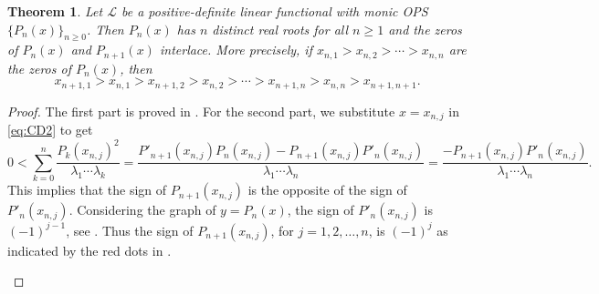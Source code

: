 \documentclass[oneside]{book}
\numberwithin{equation}{section}
\newtheorem{thm}{Theorem}[section]
\theoremstyle{definition}
\newcommand\LL{\mathcal{L}}
\begin{document}
\begin{thm}\label{thm:zero-interlace}
  Let \( \LL \) be a positive-definite linear functional with monic
  OPS \( \{ P_n(x) \}_{n\ge 0} \). Then \( P_n(x) \) has \( n \)
  distinct real roots for all \( n\ge1 \) and the zeros of
  \( P_n(x) \) and \( P_{n+1}(x) \) interlace. More precisely, if
  \( x_{n,1}>x_{n,2} > \cdots > x_{n,n} \) are the zeros of
  \( P_n(x) \), then
  \begin{equation}\label{eq:interlacing}
    x_{n+1,1} > x_{n,1} > x_{n+1,2} >x_{n,2} > \cdots >
    x_{n+1,n}> x_{n,n} >x_{n+1,n+1}.
  \end{equation}
\end{thm}
\begin{proof}
  The first part is proved in . For the second
  part, we substitute \( x=x_{n,j} \) in \eqref{eq:CD2} to get
\[
0< \sum_{k=0}^{n} \frac{P_k(x_{n,j})^2}{\lambda_1\cdots\lambda_k} =
  \frac{P'_{n+1}(x_{n,j})P_{n}(x_{n,j}) -
    P_{n+1}(x_{n,j})P'_{n}(x_{n,j})}{\lambda_1\cdots\lambda_{n}} =
  \frac{ -
    P_{n+1}(x_{n,j})P'_{n}(x_{n,j})}{\lambda_1\cdots\lambda_{n}}.
\]
This implies that the sign of \( P_{n+1}(x_{n,j}) \) is the opposite
of the sign of \( P'_{n}(x_{n,j}) \). Considering the graph of
\( y=P_n(x) \), the sign of \( P'_n(x_{n,j}) \) is \( (-1)^{j-1} \),
see . Thus the sign of \( P_{n+1}(x_{n,j}) \), for
\( j=1,2,\ldots,n \), is \( (-1)^j \) as indicated by the red dots in
.
\begin{figure}
  \centering
\end{figure}
\end{proof}
\end{document}
